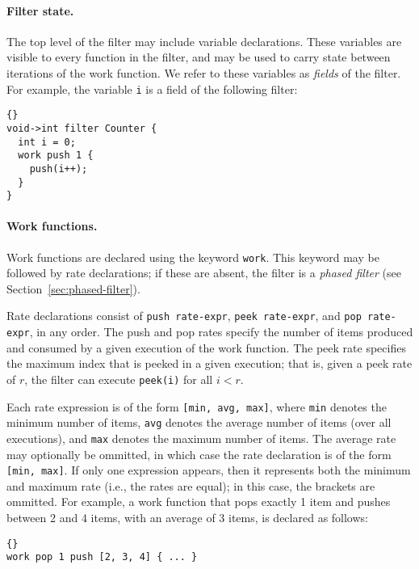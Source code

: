 \documentclass[11pt]{article}
\newcommand{\new}{\marginpar{\footnotesize \textbf{~~--~New~--}}}
\newcommand{\old}{\marginpar{\footnotesize \textbf{~~--~Old~--}}}
\begin{document}
\paragraph{Filter state.}  The top level of the filter may include
variable declarations.  These variables are visible to every function
in the filter, and may be used to carry state between iterations of
the work function.  We refer to these variables as {\it fields} of the
filter.  For example, the variable \lstinline|i| is a field of the
following filter:
\begin{lstlisting}{}
void->int filter Counter {
  int i = 0;
  work push 1 {
    push(i++);
  }
}
\end{lstlisting}{}

\paragraph{Work functions.}  Work functions are declared using the
keyword \lstinline|work|.  This keyword may be followed by rate
declarations; if these are absent, the filter is a {\old} \emph{phased
filter} (see Section~\ref{sec:phased-filter}).

Rate declarations consist of \lstinline|push rate-expr|,
\lstinline|peek rate-expr|, and \lstinline|pop rate-expr|,
in any order.  The push and pop rates specify the number of items
produced and consumed by a given execution of the work function.  The
peek rate specifies the maximum index that is peeked in a given
execution; that is, given a peek rate of $r$, the filter can execute
\lstinline|peek(i)| for all $i < r$.

Each {\new} rate expression is of the form \lstinline|[min, avg, max]|, 
where \lstinline|min| denotes the minimum number of items,
\lstinline|avg| denotes the average number of items (over all
executions), and \lstinline|max| denotes the maximum number of items.
The average rate may optionally be ommitted, in which case the rate
declaration is of the form \lstinline|[min, max]|.  If only one
expression appears, then it represents both the minimum and maximum
rate (i.e., the rates are equal); in this case, the brackets are
ommitted.  For example, a work function that pops exactly 1 item and
pushes between 2 and 4 items, with an average of 3 items, is declared
as follows:

\begin{lstlisting}{}
work pop 1 push [2, 3, 4] { ... }
\end{lstlisting}
\end{document}
